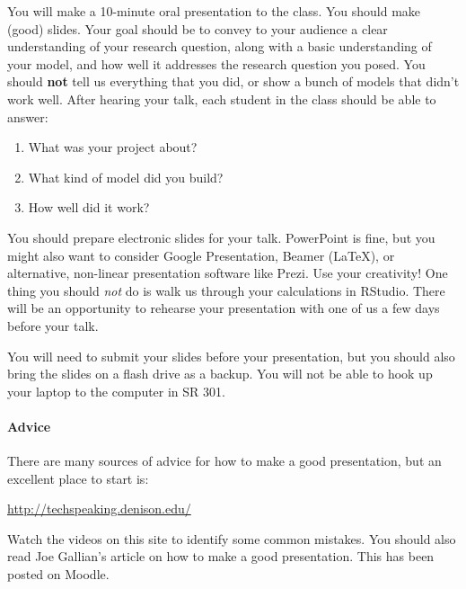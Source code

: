 \documentclass[10pt]{article}
\begin{document}
	You will make a 10-minute oral presentation to the class. You should make (good) slides. Your goal should be to convey to your audience a clear understanding of your research question, along with a basic understanding of your model, and how well it addresses the research question you posed. You should \textbf{not} tell us everything that you did, or show a bunch of models that didn't work well. After hearing your talk, each student in the class should be able to answer: 
	\begin{enumerate}
		\item What was your project about? 
		\item What kind of model did you build? 
		\item How well did it work?  
	\end{enumerate}

You should prepare electronic slides for your talk. PowerPoint is fine, but you might also want to consider Google Presentation, Beamer (\LaTeX), or alternative, non-linear presentation software like Prezi. Use your creativity! One thing you should \emph{not} do is walk us through your calculations in RStudio. 
There will be an opportunity to rehearse your presentation with one of us a few days before your talk.

You will need to submit your slides before your presentation, but you should also bring the slides on a flash drive as a backup. You will not be able to hook up your laptop to the computer in SR 301.

\paragraph{Advice}

There are many sources of advice for how to make a good presentation, but an excellent place to start is:
\begin{center}
	\url{http://techspeaking.denison.edu/}
\end{center}
Watch the videos on this site to identify some common mistakes. You should also read Joe Gallian's article on how to make a good presentation. This has been posted on Moodle. 
\end{document}
